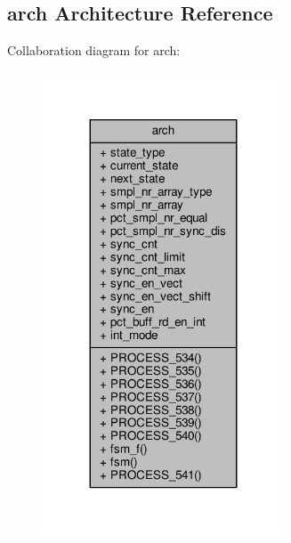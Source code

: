 \subsection{arch Architecture Reference}
\label{classp2d__sync__fsm_1_1arch}


Collaboration diagram for arch\+:\nopagebreak
\begin{figure}[H]
\begin{center}
\leavevmode
\includegraphics[width=203pt]{de/dc8/classp2d__sync__fsm_1_1arch__coll__graph}
\end{center}
\end{figure}
